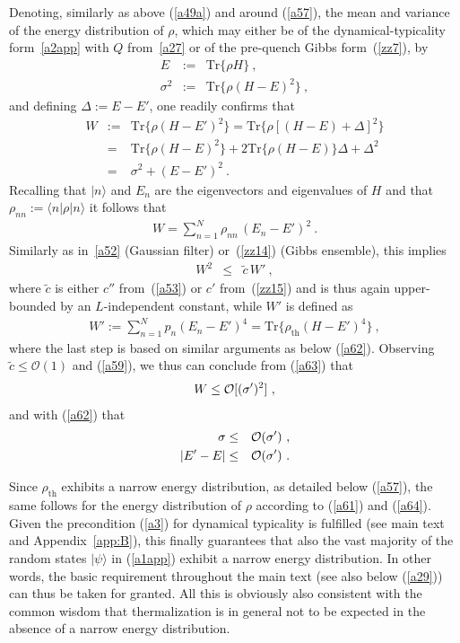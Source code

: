 \documentclass[twocolumn,aps,prb,floatfix,superscriptaddress]{revtex4-2}
\newcommand{\<}{\left\langle}	%
\renewcommand{\>}{\right\rangle}	%
\newcommand{\Pc}{\rho_{\mathrm{th}}}
\newcommand{\tr}{\mbox{Tr}}
\newcommand{\ord}{{\cal O}}
\newcommand{\mref}[1]{\ref{#1}}
\begin{document}
Denoting, similarly as above (\ref{a49a}) and 
around (\ref{a57}), 
the mean and variance of the energy distribution 
of $\rho$,
which may either be of the dynamical-typicality form~\eqref{a2app} 
with $Q$ from~\eqref{a27} or of the pre-quench Gibbs form~(\mref{zz7}),
by
\begin{eqnarray}
E & := & \tr\{\rho H\}
\ ,
\label{a60}
\\
\sigma^2 & := & \tr\{\rho (H-E)^2\}
\ ,
\label{a61}
\end{eqnarray} 
and defining $\Delta:=E-E'$,
one readily confirms that
\begin{eqnarray}
W  & := & \tr\{\rho (H-E')^2\}
=
\tr\{\rho [(H-E)+\Delta]^2\}
\nonumber
\\
& =  &  
\tr\{\rho (H-E)^2\} +
2\tr\{\rho (H-E)\}\Delta+\Delta^2
\nonumber
\\
& = &
\sigma^2+(E-E')^2
\ .
\label{a62}
\end{eqnarray}
Recalling that $|n\rangle$ and $E_n$ are the eigenvectors and
eigenvalues of $H$ and that $\rho_{nn}:=\langle n|\rho| n \rangle$
it follows that
\begin{eqnarray}
W  = \sum_{n=1}^N \rho_{nn}\, (E_n-E')^2
\ .
\label{a63}
\end{eqnarray}
Similarly as in~\eqref{a52} (Gaussian filter) or~(\mref{zz14}) (Gibbs ensemble),
this implies
\begin{eqnarray}
W^2 & \leq & \tilde c \, W'
\ ,
\label{a63a}
\end{eqnarray}
where $\tilde c$ is either $c''$ from~(\ref{a53}) or 
$c'$ from~(\mref{zz15}) and is thus again upper-bounded by an $L$-independent constant,
while $W' $ is defined as
\begin{eqnarray}
W'  := \sum_{n=1}^N p_n (E_n-E')^4
=  \tr\{\Pc (H-E')^4\}
\ ,
\label{a64a}
\end{eqnarray}
where the last step is based on similar 
arguments as below (\ref{a62}).
Observing $\tilde c \leq \mathcal{O}(1)$
and (\ref{a59}), we thus can conclude from
(\ref{a63}) that
\begin{eqnarray}
W  \leq \ord [(\sigma')^2]
\ ,
\label{a65a}
\end{eqnarray}
and with (\ref{a62}) that
\begin{eqnarray}
\sigma & \leq & \ord(\sigma')
\ ,
\label{a64}
\\
|E'-E| & \leq & \ord(\sigma')
\ .
\label{a65}
\end{eqnarray}

Since $\Pc$ exhibits a narrow energy distribution,
as detailed below (\ref{a57}), the same follows
for the energy distribution of $\rho$ according to
(\ref{a61}) and (\ref{a64}).
Given the precondition (\ref{a3}) for dynamical typicality 
is fulfilled (see main text and Appendix~\ref{app:B}),
this finally guarantees 
that also the vast majority of the random 
states $|\psi\rangle$ in (\ref{a1app}) exhibit a narrow 
energy distribution.
In other words, the basic requirement throughout 
the main text (see also below (\ref{a29}))
can thus be taken for granted.
All this is obviously also consistent with the common
wisdom that thermalization is in general not to be expected
in the absence of a narrow energy distribution.
\end{document}

